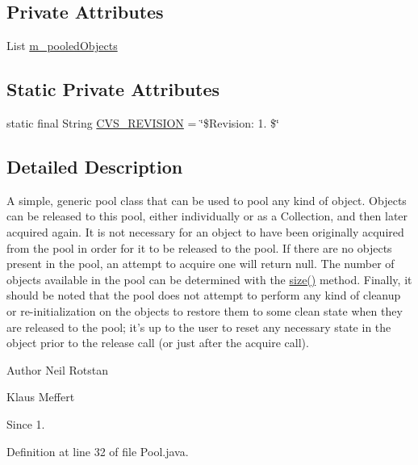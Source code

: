 \subsection*{Private Attributes}
\begin{DoxyCompactItemize}
\item 
List \hyperlink{classorg_1_1jgap_1_1impl_1_1_pool_ab6b1b9c3817ac388078aabcd0cf2206f}{m\-\_\-pooled\-Objects}
\end{DoxyCompactItemize}
\subsection*{Static Private Attributes}
\begin{DoxyCompactItemize}
\item 
static final String \hyperlink{classorg_1_1jgap_1_1impl_1_1_pool_ab7440c6f3b541e84d9c1ea60dd2c4bd6}{C\-V\-S\-\_\-\-R\-E\-V\-I\-S\-I\-O\-N} = \char`\"{}\$Revision\-: 1. \$\char`\"{}
\end{DoxyCompactItemize}


\subsection{Detailed Description}
A simple, generic pool class that can be used to pool any kind of object. Objects can be released to this pool, either individually or as a Collection, and then later acquired again. It is not necessary for an object to have been originally acquired from the pool in order for it to be released to the pool. If there are no objects present in the pool, an attempt to acquire one will return null. The number of objects available in the pool can be determined with the \hyperlink{classorg_1_1jgap_1_1impl_1_1_pool_a22f44a20fa8f6867604a9c2d39fbc16a}{size()} method. Finally, it should be noted that the pool does not attempt to perform any kind of cleanup or re-\/initialization on the objects to restore them to some clean state when they are released to the pool; it's up to the user to reset any necessary state in the object prior to the release call (or just after the acquire call).

\begin{DoxyAuthor}{Author}
Neil Rotstan 

Klaus Meffert 
\end{DoxyAuthor}
\begin{DoxySince}{Since}
1. 
\end{DoxySince}


Definition at line 32 of file Pool.\-java.



